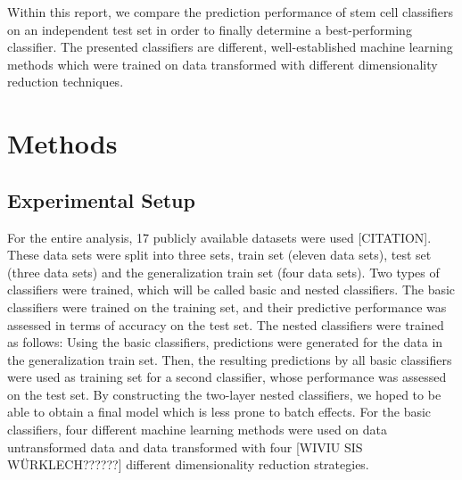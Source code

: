 \documentclass[10pt,conference,compsocconf]{IEEEtran}
\begin{document}
\par
Within this report, we compare the prediction performance of stem cell classifiers on an independent test set in order to finally determine a best-performing classifier. The presented classifiers are different, well-established machine learning methods which were trained on data transformed with different dimensionality reduction techniques. 

\section*{Methods}
\subsection{Experimental Setup}
For the entire analysis, 17 publicly available datasets were used [CITATION]. These data sets were split into three sets, train set (eleven data sets), test set (three data sets) and the generalization train set (four data sets). Two types of classifiers were trained, which will be called basic and nested classifiers. The basic classifiers were trained on the training set, and their predictive performance was assessed in terms of accuracy on the test set. The nested classifiers were trained as follows: Using the basic classifiers, predictions were generated for the data in the generalization train set. Then, the resulting predictions by all basic classifiers were used as training set for a second classifier, whose performance was assessed on the test set. By constructing the two-layer nested classifiers, we hoped to be able to obtain a final model which is less prone to batch effects. 
For the basic classifiers, four different machine learning methods were used on data untransformed data and data transformed with four [WIVIU SIS WÜRKLECH??????] different dimensionality reduction strategies. 
\end{document}
